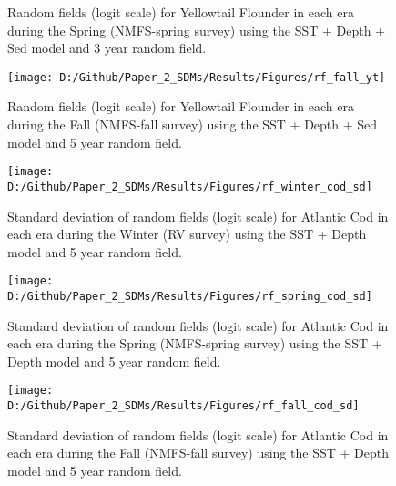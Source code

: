 \documentclass[
]{article}
\begin{document}
\begin{landscape}
\begin{figure}[htb]
\caption{Random fields (logit scale) for Yellowtail Flounder in each era during the Spring (NMFS-spring survey) using the SST + Depth + Sed model and 3 year random field.}\label{fig:rf-spring-yt}
\end{figure}

\newpage
\begin{figure}[htb]

{\centering \texttt{[image: D:/Github/Paper\_2\_SDMs/Results/Figures/rf\_fall\_yt]} 

}

\caption{Random fields (logit scale) for Yellowtail Flounder in each era during the Fall (NMFS-fall survey) using the SST + Depth + Sed model and 5 year random field.}\label{fig:rf-fall-yt}
\end{figure}

\newpage

\begin{figure}[htb]

{\centering \texttt{[image: D:/Github/Paper\_2\_SDMs/Results/Figures/rf\_winter\_cod\_sd]} 

}

\caption{Standard deviation of random fields (logit scale) for Atlantic Cod  in each era during the Winter (RV survey) using the SST + Depth model and 5 year random field.}\label{fig:rf-winter-cod-sd}
\end{figure}

\newpage
\begin{figure}[htb]

{\centering \texttt{[image: D:/Github/Paper\_2\_SDMs/Results/Figures/rf\_spring\_cod\_sd]} 

}

\caption{Standard deviation of random fields (logit scale) for Atlantic Cod  in each era during the Spring (NMFS-spring survey) using the SST + Depth model and 5 year random field.}\label{fig:rf-spring-cod-sd}
\end{figure}

\newpage
\begin{figure}[htb]

{\centering \texttt{[image: D:/Github/Paper\_2\_SDMs/Results/Figures/rf\_fall\_cod\_sd]} 

}

\caption{Standard deviation of random fields (logit scale) for Atlantic Cod  in each era during the Fall (NMFS-fall survey) using the SST + Depth model and 5 year random field.}\label{fig:rf-fall-cod-sd}
\end{figure}


\end{landscape}
\end{document}
